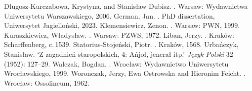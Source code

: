 \documentclass[guide]{pol-ren}
\begin{document}
\begin{literature}
\lit Długosz-Kurczabowa, Krystyna, and Stanisław Dubisz. . Warsaw: Wydawnictwa Uniwersytetu
  Warszawskiego, 2006.
\lit German, Jan. . PhD dissertation, Uniwersytet Jagielloński, 2023.
\lit Klemensiewicz, Zenon. . Warsaw: PWN, 1999.
\lit Kuraszkiewicz, Władysław. .
  Warsaw: PZWS, 1972.
\lit Liban, Jerzy. .
  Kraków: Scharffenberg, c.\,1539.
\lit Statorius-Stojeński, Piotr. .
  Kraków, 1568.
\lit Urbańczyk, Stanisław. ‘Z zagadnień staropolskich, 4: Ańjoł, jenerał
  itp.’ \textit{Język Polski} 32 (1952): 127–29.
\lit Walczak, Bogdan. . Wrocław:
  Wydawnictwo Uniwersytetu Wrocławskiego, 1999.
\lit Woronczak, Jerzy, Ewa Ostrowska and Hieronim Feicht. .
  Wrocław: Ossolineum, 1962.
\end{literature}
\end{document}

